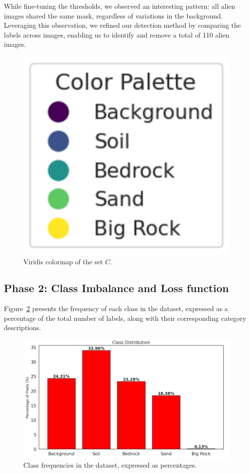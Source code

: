 \documentclass[11pt]{article}
\begin{document}
\begin{multicols*}{2}
    While fine-tuning the thresholds, we observed an interesting pattern: all alien images shared the same mask, regardless of variations in the background. Leveraging this observation, we refined our detection method by comparing the labels across images, enabling us to identify and remove a total of 110 alien images.

    \begin{figure}[H]
            \centering
            \includegraphics[width=0.35\linewidth]{figures/mars_palette.png}
            \caption{Viridis colormap of the set $C$.}
            \label{fig:palette}
    \end{figure}

    \subsection{Phase 2: Class Imbalance and Loss function}

    Figure~\ref{fig:freq} presents the frequency of each class in the dataset, expressed as a percentage of the total number of labels, along with their corresponding category descriptions.

    \begin{figure}[H]
    \centering
    \includegraphics[width=\linewidth]{figures/freq.png}
    \caption{Class frequencies in the dataset, expressed as percentages.}
    \label{fig:freq}
    \end{figure}
    

\end{multicols*}
\end{document}

